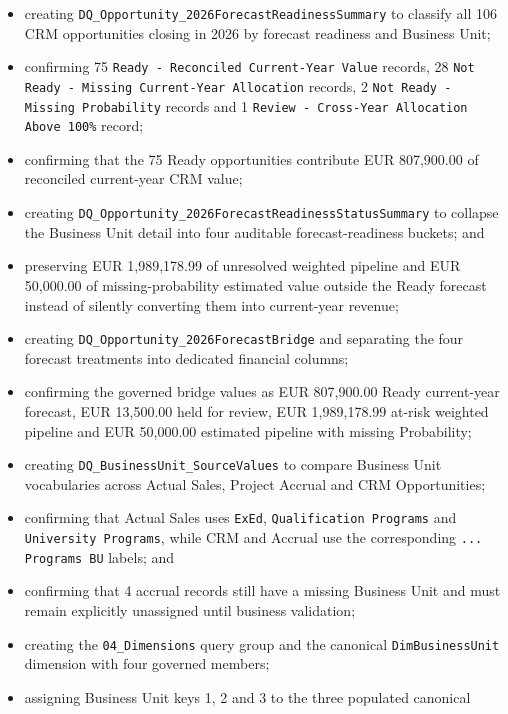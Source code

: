 \documentclass[11pt,a4paper]{article}
\begin{document}
\begin{itemize}[leftmargin=7mm,itemsep=3pt]
    weighted risk, EUR 1,229,613.75 across 18 records;
    \item creating \texttt{DQ\_Opportunity\_2026ForecastReadinessSummary} to classify
    all 106 CRM opportunities closing in 2026 by forecast readiness and Business Unit;
    \item confirming 75 \texttt{Ready - Reconciled Current-Year Value} records,
    28 \texttt{Not Ready - Missing Current-Year Allocation} records,
    2 \texttt{Not Ready - Missing Probability} records and
    1 \texttt{Review - Cross-Year Allocation Above 100\%} record;
    \item confirming that the 75 Ready opportunities contribute
    EUR 807,900.00 of reconciled current-year CRM value;
    \item creating \texttt{DQ\_Opportunity\_2026ForecastReadinessStatusSummary} to
    collapse the Business Unit detail into four auditable forecast-readiness buckets; and
    \item preserving EUR 1,989,178.99 of unresolved weighted pipeline and
    EUR 50,000.00 of missing-probability estimated value outside the Ready forecast
    instead of silently converting them into current-year revenue;
    \item creating \texttt{DQ\_Opportunity\_2026ForecastBridge} and separating the
    four forecast treatments into dedicated financial columns;
    \item confirming the governed bridge values as EUR 807,900.00 Ready current-year
    forecast, EUR 13,500.00 held for review, EUR 1,989,178.99 at-risk weighted
    pipeline and EUR 50,000.00 estimated pipeline with missing Probability;
    \item creating \texttt{DQ\_BusinessUnit\_SourceValues} to compare Business Unit
    vocabularies across Actual Sales, Project Accrual and CRM Opportunities;
    \item confirming that Actual Sales uses \texttt{ExEd},
    \texttt{Qualification Programs} and \texttt{University Programs}, while CRM and
    Accrual use the corresponding \texttt{... Programs BU} labels; and
    \item confirming that 4 accrual records still have a missing Business Unit and
    must remain explicitly unassigned until business validation;
    \item creating the \texttt{04\_Dimensions} query group and the canonical
    \texttt{DimBusinessUnit} dimension with four governed members;
    \item assigning Business Unit keys 1, 2 and 3 to the three populated canonical

\end{itemize}
\end{document}
